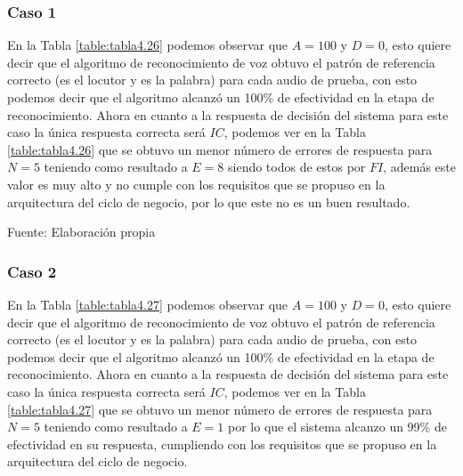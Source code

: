 \subsubsection{Caso 1}
En la Tabla \ref{table:tabla4.26} podemos observar que $A = 100$ y $D = 0$, esto quiere decir que el algoritmo de reconocimiento de voz obtuvo el patrón de referencia correcto (es el locutor y es la palabra) para cada audio de prueba, con esto podemos decir que el algoritmo alcanzó un 100\% de efectividad en la etapa de reconocimiento.
\vskip 0.5cm
Ahora en cuanto a la respuesta de decisión del sistema para este caso la única respuesta correcta será $IC$, podemos ver en la Tabla \ref{table:tabla4.26} que se obtuvo un menor número de errores de respuesta para $N = 5$ teniendo como resultado a $E = 8$ siendo todos de estos por $FI$, además este valor es muy alto y no cumple con los requisitos que se propuso en la arquitectura del ciclo de negocio, por lo que este no es un buen resultado.

\begin{center}
\begin{table}[H]
\centering
\caption{\small{Resultados para el caso 1 con U1 estático.}}
\label{table:tabla4.26}
\vskip 0.2cm
\begin{center}
\vskip 0.2cm
{\small{Fuente: Elaboración propia}}
\end{center}
\end{table}
\end{center}

\subsubsection{Caso 2}
En la Tabla \ref{table:tabla4.27} podemos observar que $A = 100$ y $D = 0$, esto quiere decir que el algoritmo de reconocimiento de voz obtuvo el patrón de referencia correcto (es el locutor y es la palabra) para cada audio de prueba, con esto podemos decir que el algoritmo alcanzó un 100\% de efectividad en la etapa de reconocimiento.
\vskip 0.5cm
Ahora en cuanto a la respuesta de decisión del sistema para este caso la única respuesta correcta será $IC$, podemos ver en la Tabla \ref{table:tabla4.27} que se obtuvo un menor número de errores de respuesta para $N = 5$ teniendo como resultado a $E = 1$ por lo que el sistema alcanzo un 99\% de efectividad en su respuesta, cumpliendo con los requisitos que se propuso en la arquitectura del ciclo de negocio.

